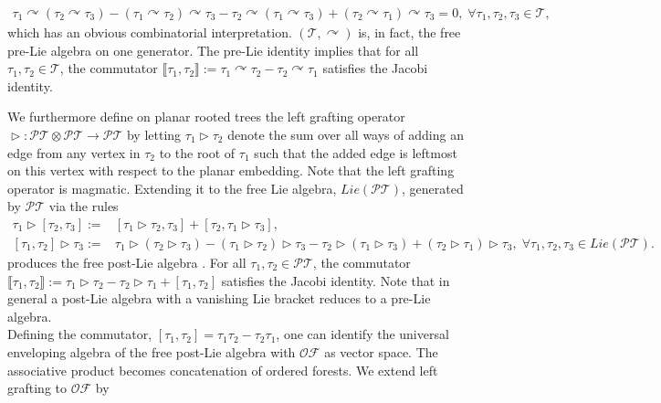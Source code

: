\documentclass[10pt,a4paper]{article}
\DeclareMathOperator{\graft}{\triangleright}
\begin{document}
\allowdisplaybreaks
\begin{align*}
\tau_1 \curvearrowright (\tau_2 \curvearrowright \tau_3) - (\tau_1\curvearrowright \tau_2) \curvearrowright \tau_3 - \tau_2 \curvearrowright (\tau_1 \curvearrowright \tau_3) + (\tau_2 \curvearrowright \tau_1) \curvearrowright \tau_3=0, \; \forall \tau_1,\tau_2,\tau_3 \in \mathcal{T},
\end{align*}
which has an obvious combinatorial interpretation. $(\mathcal{T},\curvearrowright )$ is, in fact, the free pre-Lie algebra on one generator. The pre-Lie identity implies that for all $\tau_1,\tau_2 \in \mathcal{T}$, the commutator $\llbracket \tau_1,\tau_2 \rrbracket := \tau_1\curvearrowright \tau_2 - \tau_2 \curvearrowright \tau_1$ satisfies the Jacobi identity.

We furthermore define on planar rooted trees the left grafting operator $\graft: \mathcal{PT} \otimes \mathcal{PT} \to \mathcal{PT}$ by letting $\tau_1 \graft \tau_2$ denote the sum over all ways of adding an edge from any vertex in $\tau_2$ to the root of $\tau_1$ such that the added edge is leftmost on this vertex with respect to the planar embedding. Note that the left grafting operator is magmatic. Extending it to the free Lie algebra, $Lie(\mathcal{PT})$, generated by $\mathcal{PT}$ via the rules
\allowdisplaybreaks
\begin{align*}
\tau_1 \graft [\tau_2,\tau_3]:=&[\tau_1 \graft \tau_2,\tau_3] + [\tau_2,\tau_1 \graft \tau_3], \\
[\tau_1,\tau_2] \graft \tau_3 :=& \tau_1 \graft (\tau_2 \graft \tau_3) - (\tau_1 \graft \tau_2) \graft \tau_3 - \tau_2 \graft (\tau_1 \graft \tau_3) + (\tau_2 \graft \tau_1)\graft \tau_3, \; \forall \tau_1,\tau_2,\tau_3 \in Lie(\mathcal{PT}).
\end{align*}
produces the free post-Lie algebra \cite{CurryEbrahimi-FardMunthe-Kaas2017,Ebrahimi-FardLundervoldMunthe-Kaas2014,LundervoldMunthe-Kaas2011,Munthe-KaasLundervold2012,Silva2018}. For all $\tau_1,\tau_2 \in \mathcal{PT}$, the commutator $\llbracket \tau_1,\tau_2 \rrbracket := \tau_1 \graft \tau_2 - \tau_2 \graft \tau_1 + [\tau_1,\tau_2]$ satisfies the Jacobi identity. Note that in general a post-Lie algebra with a vanishing Lie bracket reduces to a pre-Lie algebra.\\
Defining the commutator, $[\tau_1,\tau_2]=\tau_1\tau_2-\tau_2\tau_1$, one can identify the universal enveloping algebra of the free post-Lie algebra with $\mathcal{OF}$ as vector space. The associative product becomes concatenation of ordered forests. We extend left grafting to $\mathcal{OF}$ by
\end{document}
